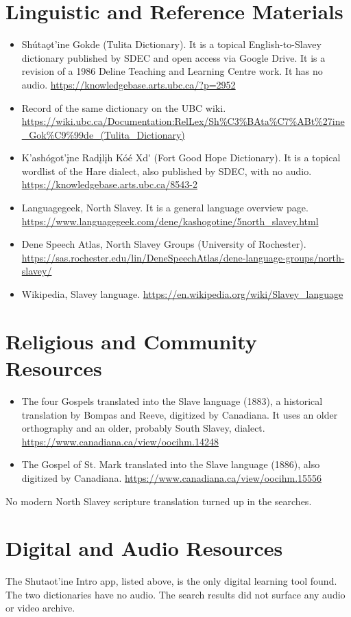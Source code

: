 \documentclass[12pt]{article}
\begin{document}
\section{Linguistic and Reference Materials}
\begin{itemize}
\item Sh\'uta\k{o}t'ine Gok\textschwa de (Tulita Dictionary). It is a topical English-to-Slavey dictionary published by SDEC and open access via Google Drive. It is a revision of a 1986 Deline Teaching and Learning Centre work. It has no audio. \url{https://knowledgebase.arts.ubc.ca/?p=2952}
\item Record of the same dictionary on the UBC wiki. \url{https://wiki.ubc.ca/Documentation:RelLex/Sh%C3%BAta%C7%ABt%27ine_Gok%C9%99de_(Tulita_Dictionary)}
\item K'ash\'ogot'\k{i}ne Rad\k{i}l\k{i}h K\'o\'e X\textschwa d\textschwa\'{} (Fort Good Hope Dictionary). It is a topical wordlist of the Hare dialect, also published by SDEC, with no audio. \url{https://knowledgebase.arts.ubc.ca/8543-2}
\item Languagegeek, North Slavey. It is a general language overview page. \url{https://www.languagegeek.com/dene/kashogotine/5north_slavey.html}
\item Dene Speech Atlas, North Slavey Groups (University of Rochester). \url{https://sas.rochester.edu/lin/DeneSpeechAtlas/dene-language-groups/north-slavey/}
\item Wikipedia, Slavey language. \url{https://en.wikipedia.org/wiki/Slavey_language}
\end{itemize}

\section{Religious and Community Resources}
\begin{itemize}
\item The four Gospels translated into the Slave language (1883), a historical translation by Bompas and Reeve, digitized by Canadiana. It uses an older orthography and an older, probably South Slavey, dialect. \url{https://www.canadiana.ca/view/oocihm.14248}
\item The Gospel of St. Mark translated into the Slave language (1886), also digitized by Canadiana. \url{https://www.canadiana.ca/view/oocihm.15556}
\end{itemize}
No modern North Slavey scripture translation turned up in the searches.

\section{Digital and Audio Resources}
The Shutaot'ine Intro app, listed above, is the only digital learning tool found. The two dictionaries have no audio. The search results did not surface any audio or video archive.
\end{document}
